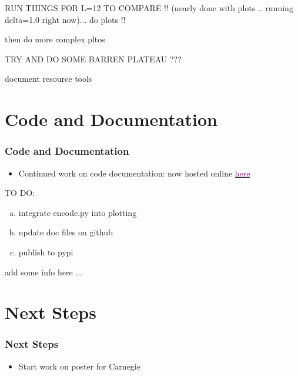 \documentclass{beamer}
\begin{document}
\begin{frame}
RUN THINGS FOR L=12 TO COMPARE !!
(nearly done with plots .. running delta=1.0 right now)...
do plots !!

then do more complex pltos 


TRY AND DO SOME BARREN PLATEAU ???

document resource tools 
\end{frame}

\section{Code and Documentation}

\begin{frame}
\frametitle{Code and Documentation}
\begin{itemize}
\item Continued work on code documentation: now hosted online \href{https://david-f-amorim.github.io/PQC_function_evaluation/pqcprep.html}{\textcolor{purple}{here}}
\end{itemize}
TO DO:
\begin{enumerate}[(a)]

\item integrate encode.py into plotting 
\item update doc files on github 
\item publish to pypi 
\end{enumerate}
add some info here ...

\end{frame}

\section{Next Steps}

\begin{frame}
\frametitle{Next Steps}

\begin{itemize}
\item Start work on poster for Carnegie 
\end{itemize}

\end{frame}
\end{document}
